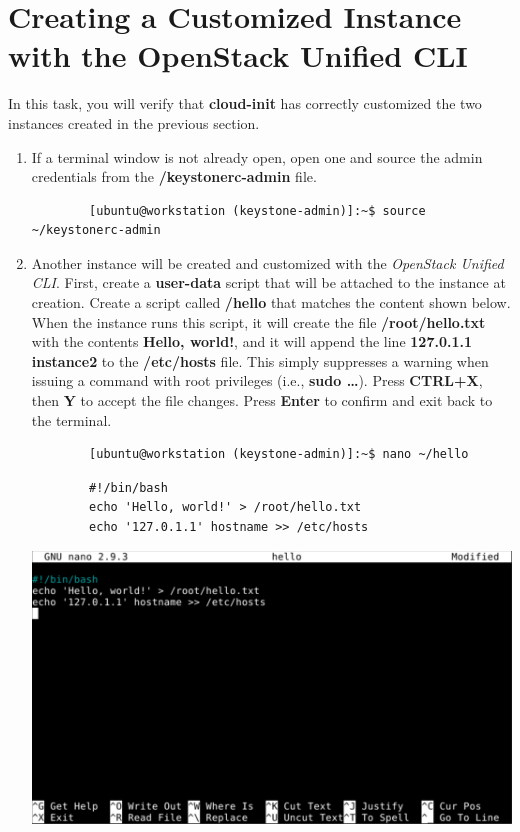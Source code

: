 \documentclass[letterpaper, 12pt]{article}
\begin{document}
\section{Creating a Customized Instance with the OpenStack Unified CLI}
\label{sec:creating_a_customized_instance_using_the_openstack_unified_cli}
In this task, you will verify that \textbf{cloud-init} has correctly customized the two instances created in the previous section.

\begin{enumerate}
    \item If a terminal window is not already open, open one and source the admin credentials from the \textbf{\texttildemid/keystonerc-admin} file.
    \begin{lstlisting}
        [ubuntu@workstation (keystone-admin)]:~$ source ~/keystonerc-admin
    \end{lstlisting}

    \item Another instance will be created and customized with the \textit{OpenStack Unified CLI}.
    First, create a \textbf{user-data} script that will be attached to the instance at creation.
    Create a script called \textbf{\texttildemid/hello} that matches the content shown below.
    When the instance runs this script, it will create the file \textbf{/root/hello.txt} with the contents \textbf{Hello, world!}, and it will append the line \textbf{127.0.1.1 instance2} to the \textbf{/etc/hosts} file.
    This simply suppresses a warning when issuing a command with root privileges (i.e., \textbf{sudo …}).
    Press \textbf{CTRL+X}, then \textbf{Y} to accept the file changes.
    Press \textbf{Enter} to confirm and exit back to the terminal.
    \begin{lstlisting}
        [ubuntu@workstation (keystone-admin)]:~$ nano ~/hello
    \end{lstlisting}
    \begin{lstlisting}
        #!/bin/bash
        echo 'Hello, world!' > /root/hello.txt
        echo '127.0.1.1' hostname >> /etc/hosts
    \end{lstlisting}

    \begin{center}
        \includegraphics[width=\linewidth]{images/part3/step2.png}
    \end{center}


\end{enumerate}
\end{document}
